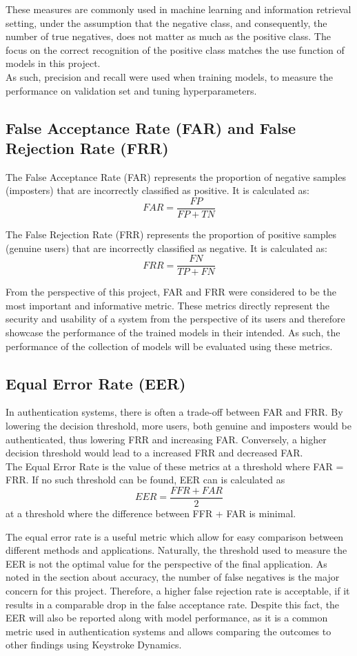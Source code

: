 These measures are commonly used in machine learning and information retrieval setting, under the assumption that the negative class, and consequently, the number of true negatives, does not matter as much as the positive class. The focus on the correct recognition of the positive class matches the use function of models in this project.\\
As such, precision and recall were used when training models, to measure the performance on validation set and tuning hyperparameters.

\subsection{False Acceptance Rate (FAR) and False Rejection Rate (FRR)} \label{FAR_FRR_theory}
The False Acceptance Rate (FAR) represents the proportion of negative samples (imposters) that are incorrectly classified as positive. It is calculated as:
\[
FAR = \frac{FP}{FP + TN}
\]

The False Rejection Rate (FRR) represents the proportion of positive samples (genuine users) that are incorrectly classified as negative. It is calculated as:
\[
FRR = \frac{FN}{TP + FN}
\]

From the perspective of this project, FAR and FRR were considered to be the most important and informative metric. These metrics directly represent the security and usability of a system from the perspective of its users and therefore showcase the performance of the trained models in their intended. As such, the performance of the collection of models will be evaluated using these metrics. 

\subsection{Equal Error Rate (EER)}
In authentication systems, there is often a trade-off between FAR and FRR. By lowering the decision threshold, more users, both genuine and imposters would be authenticated, thus lowering FRR and increasing FAR. Conversely, a higher decision threshold would lead to a increased FRR and decreased FAR. \\
The Equal Error Rate is the value of these metrics at a threshold where FAR = FRR. If no such threshold can be found, EER can is calculated as  
\[
EER = \frac{FFR + FAR}{2}
\]
at a threshold where the difference between FFR + FAR is minimal.

The equal error rate is a useful metric which allow for easy comparison between different methods and applications. Naturally, the threshold used to measure the EER is not the optimal value for the perspective of the final application. As noted in the section about accuracy, the number of false negatives is the major concern for this project. Therefore, a higher false rejection rate is acceptable, if it results in a comparable drop in the false acceptance rate. Despite this fact, the EER will also be reported along with model performance, as it is a common metric used in authentication systems and allows comparing the outcomes to other findings using Keystroke Dynamics.
